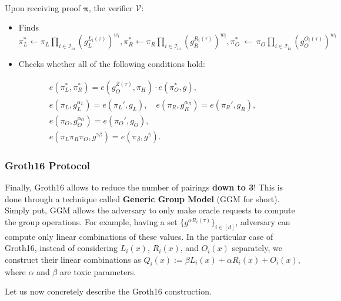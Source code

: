 \documentclass[../lecture-notes.tex]{subfiles}
\begin{document}
\begin{tcolorbox}
\begin{itemize}[label=, left=0mm]
\begin{equation*}
\begin{aligned}
            \end{aligned}
        \end{equation*}
    \end{itemize}
    \newpage
    Upon receiving proof $\boldsymbol{\pi}$, the verifier $\mathcal{V}$:
    \begin{itemize}[label=, left=0mm]
        \item Finds $\pi_L^* \gets \pi_L\prod_{i \in \mathcal{I}_{\text{io}}} (g_L^{L_i(\tau)})^{w_i},\pi_R^* \gets \pi_R\prod_{i \in \mathcal{I}_{\text{io}}} (g_R^{R_i(\tau)})^{w_i},\pi_O^*~\gets~\pi_O\prod_{i \in \mathcal{I}_{\text{io}}} (g_O^{O_i(\tau)})^{w_i}$
        \item Checks whether all of the following conditions hold:
        
    \end{itemize}
    \begin{align*}
        e(\pi_L^*, \pi_R^*) = e(g_O^{Z(\tau)}, \pi_H)\cdot e(\pi_O^*, g),\\
        e(\pi_L, g_L^{\alpha_L}) = e(\pi_L', g_L), \quad e(\pi_R, g_R^{\alpha_R}) = e(\pi_R', g_R),\\
        e(\pi_O, g_O^{\alpha_O}) = e(\pi_O', g_O), \\
        e(\pi_L\pi_R\pi_O, g^{\gamma\beta}) = e(\pi_{\beta}, g^{\gamma}).
    \end{align*}
\end{tcolorbox}

\subsubsection{Groth16 Protocol}

Finally, Groth16 allows to reduce the number of pairings \textbf{down to 3}! This is done through a technique called \textbf{Generic Group Model} (GGM for short). Simply put, GGM allows the adversary to only make oracle requests to compute the group operations. For example, having a set $\{g^{\alpha R_i(\tau)}\}_{i \in [d]}$, adversary can compute only linear combinations of these values. In the particular case of Groth16, instead of considering $L_i(x)$, $R_i(x)$, and $O_i(x)$ separately, we construct their linear combinations as $Q_i(x) := \beta L_i(x) + \alpha R_i(x) + O_i(x)$, where $\alpha$ and $\beta$ are toxic parameters.

Let us now concretely describe the Groth16 construction.
\end{document}
